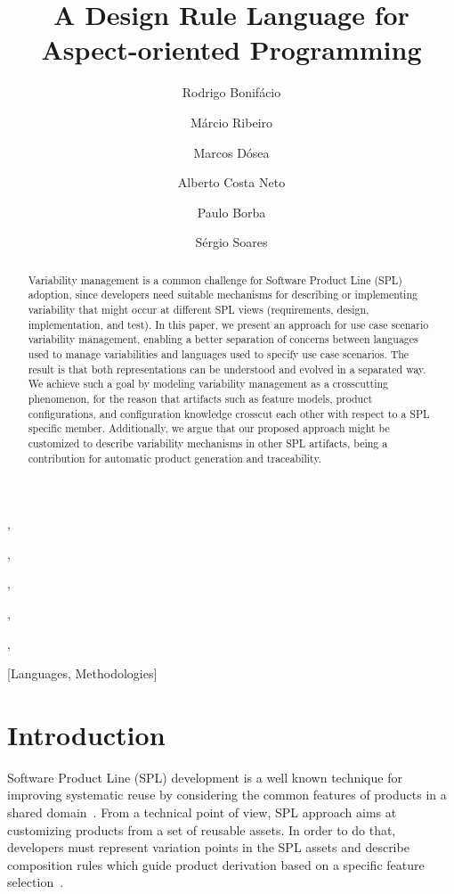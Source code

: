 \documentclass{report}
\begin{document}
\begin{frontmatter}

\title{A Design Rule Language for Aspect-oriented Programming}

\author[UFPE]{Rodrigo Bonif\'{a}cio},
\author[UFPE]{M\'{a}rcio Ribeiro},
\author[UFPE]{Marcos D\'{o}sea},
\author[UFPE]{Alberto Costa Neto},
\author[UFPE]{Paulo Borba},
\author[UPE]{S\'ergio Soares}
\address[UFPE]{Informatics Center, Federal University of Pernambuco, Recife,
Brazil}
\address[UPE]{Department of Computing and
Systems, University of Pernambuco, Recife, Brazil}


\maketitle              

\begin{abstract}
Variability management is a common challenge for Software Product
Line (SPL) adoption, since developers need suitable
mechanisms for describing or implementing variability
that might occur at different SPL views (requirements, design,
implementation, and test). In this paper, we present an approach for
use case scenario variability management, enabling a better
separation of concerns between languages used to manage
variabilities and languages used to specify use case scenarios. The
result is that both representations can be understood and evolved in
a separated way. We achieve such a goal by modeling variability management
as a crosscutting phenomenon, for the reason that artifacts such as feature models, 
product configurations, and configuration knowledge crosscut each 
other with respect to a SPL specific member. Additionally, we argue 
that our proposed approach might be customized to describe variability
mechanisms in other SPL artifacts, being a contribution for
automatic product generation and traceability.
\end{abstract}

[Languages,
Methodologies]\



%
\section{Introduction}
%
Software Product Line (SPL) development is a well known technique for 
improving systematic reuse by considering the common features of products in a 
shared domain~\cite{northrop-spl-book}. From a technical point of view, 
SPL approach aims at customizing products from a set of reusable assets. 
In order to do that, developers must represent variation points in the SPL 
assets and describe composition rules which guide product derivation based 
on a specific feature selection~\cite{phol-spl-book}. 


\end{frontmatter}
\end{document}

